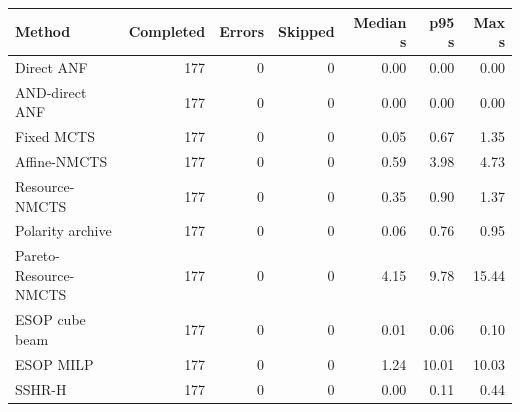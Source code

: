 \begin{tabular}{lrrrrrr}
\toprule
Method & Completed & Errors & Skipped & Median s & p95 s & Max s \\
\midrule
Direct ANF & 177 & 0 & 0 & 0.00 & 0.00 & 0.00 \\
AND-direct ANF & 177 & 0 & 0 & 0.00 & 0.00 & 0.00 \\
Fixed MCTS & 177 & 0 & 0 & 0.05 & 0.67 & 1.35 \\
Affine-NMCTS & 177 & 0 & 0 & 0.59 & 3.98 & 4.73 \\
Resource-NMCTS & 177 & 0 & 0 & 0.35 & 0.90 & 1.37 \\
Polarity archive & 177 & 0 & 0 & 0.06 & 0.76 & 0.95 \\
Pareto-Resource-NMCTS & 177 & 0 & 0 & 4.15 & 9.78 & 15.44 \\
ESOP cube beam & 177 & 0 & 0 & 0.01 & 0.06 & 0.10 \\
ESOP MILP & 177 & 0 & 0 & 1.24 & 10.01 & 10.03 \\
SSHR-H & 177 & 0 & 0 & 0.00 & 0.11 & 0.44 \\
\bottomrule
\end{tabular}
